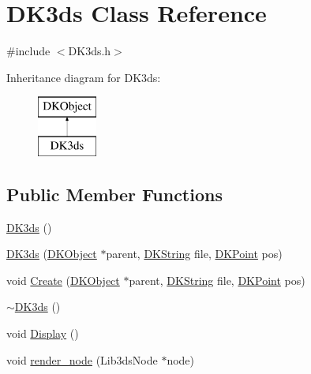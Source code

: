\hypertarget{class_d_k3ds}{\section{D\-K3ds Class Reference}
\label{class_d_k3ds}
}


{\ttfamily \#include $<$D\-K3ds.\-h$>$}

Inheritance diagram for D\-K3ds\-:\begin{figure}[H]
\begin{center}
\leavevmode
\includegraphics[height=2.000000cm]{class_d_k3ds}
\end{center}
\end{figure}
\subsection*{Public Member Functions}
\begin{DoxyCompactItemize}
\item 
\hyperlink{class_d_k3ds_a3fa5c7306fffeaaef7482ff7f5d2e786}{D\-K3ds} ()
\item 
\hyperlink{class_d_k3ds_a09d97dbfa0f403572793a847313d374e}{D\-K3ds} (\hyperlink{class_d_k_object}{D\-K\-Object} $\ast$parent, \hyperlink{_d_k_string_8h_ac168e8555ceba18e1a2919b21976bc84}{D\-K\-String} file, \hyperlink{_d_k_axis_8h_a0ca1f005fbb936f8e7a7f2433591f418}{D\-K\-Point} pos)
\item 
void \hyperlink{class_d_k3ds_a022bcd3888298e789c808b1dc13c18d3}{Create} (\hyperlink{class_d_k_object}{D\-K\-Object} $\ast$parent, \hyperlink{_d_k_string_8h_ac168e8555ceba18e1a2919b21976bc84}{D\-K\-String} file, \hyperlink{_d_k_axis_8h_a0ca1f005fbb936f8e7a7f2433591f418}{D\-K\-Point} pos)
\item 
\hyperlink{class_d_k3ds_a4388863acdd64c1fcb3a6a77689b7700}{$\sim$\-D\-K3ds} ()
\item 
void \hyperlink{class_d_k3ds_ab914c6d249f79cb19e99ebd7cb477067}{Display} ()
\item 
void \hyperlink{class_d_k3ds_a1fbf931413b0346cb344d53d41b544ae}{render\-\_\-node} (Lib3ds\-Node $\ast$node)
\end{DoxyCompactItemize}
